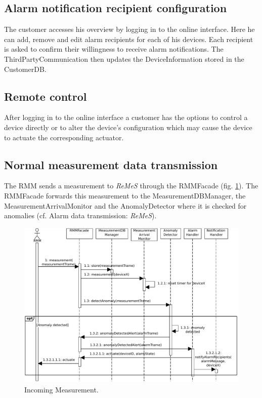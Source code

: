 \documentclass[a4paper,10pt]{article}
\newcommand{\rem}{\emph{ReMeS}\xspace}
\begin{document}
\subsection{Alarm notification recipient configuration}
The customer accesses his overview by logging in to the online interface. Here he can add, remove and edit alarm recipients for each of his devices. Each recipient is asked to confirm their willingness to receive alarm notifications. The ThirdPartyCommunication then updates the DeviceInformation stored in the CustomerDB.

\subsection{Remote control}
After logging in to the online interface a customer has the options to control a device directly or to alter the device's configuration which may cause the device to actuate the corresponding actuator.

\subsection{Normal measurement data transmission}
The RMM sends a measurement to \rem through the RMMFacade (fig. \ref{fig:seq_measurement}). The RMMFacade forwards this measurement to the MeasurementDBManager, the MeasurementArrivalMonitor and the AnomalyDetector where it is checked for anomalies (cf. Alarm data transmission: \rem).

\begin{figure}[!htp]
    \centering
    \includegraphics[width=\textwidth]{RMM_Transmission}
    \caption{Incoming Measurement.}
    \label{fig:seq_measurement}
\end{figure}
\end{document}
